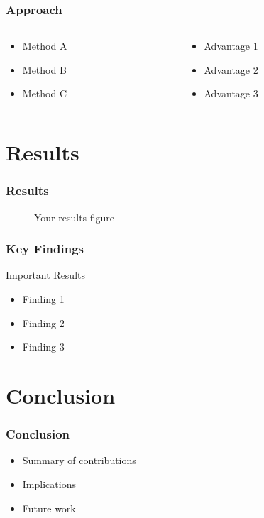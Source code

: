 \documentclass{beamer}
\begin{document}
\begin{frame}
\frametitle{Approach}
\begin{columns}
\begin{column}{0.5\textwidth}
\begin{itemize}
    \item Method A
    \item Method B
    \item Method C
\end{itemize}
\end{column}
\begin{column}{0.5\textwidth}
\begin{itemize}
    \item Advantage 1
    \item Advantage 2
    \item Advantage 3
\end{itemize}
\end{column}
\end{columns}
\end{frame}

\section{Results}
\begin{frame}
\frametitle{Results}
\begin{figure}
\centering
\caption{Your results figure}
\end{figure}
\end{frame}

\begin{frame}
\frametitle{Key Findings}
\begin{alertblock}{Important Results}
\begin{itemize}
    \item Finding 1
    \item Finding 2
    \item Finding 3
\end{itemize}
\end{alertblock}
\end{frame}

\section{Conclusion}
\begin{frame}
\frametitle{Conclusion}
\begin{itemize}
    \item Summary of contributions
    \item Implications
    \item Future work
\end{itemize}
\end{frame}
\end{document}
